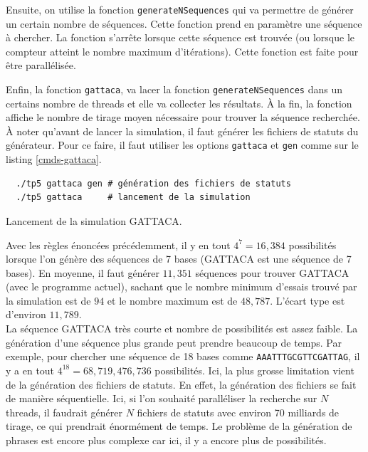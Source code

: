 \documentclass[a4paper]{article}
\begin{document}
Ensuite, on utilise la fonction \texttt{generateNSequences} qui va permettre
de générer un certain nombre de séquences. Cette fonction prend en paramètre une
séquence à chercher. La fonction s'arrête lorsque cette séquence est trouvée (ou
lorsque le compteur atteint le nombre maximum d'itérations). Cette fonction est
faite pour être parallélisée.

Enfin, la fonction \texttt{gattaca}, va lacer la fonction
\texttt{generateNSequences} dans un certains nombre de threads et elle va
collecter les résultats. À la fin, la fonction affiche le nombre de tirage moyen
nécessaire pour trouver la séquence recherchée.\\

À noter qu'avant de lancer la simulation, il faut générer les fichiers de
statuts du générateur. Pour ce faire, il faut utiliser les options
\texttt{gattaca} et \texttt{gen} comme sur le listing \ref{cmds-gattaca}.

\begin{listing}[ht!]
\begin{verbatim}
  ./tp5 gattaca gen # génération des fichiers de statuts
  ./tp5 gattaca     # lancement de la simulation
\end{verbatim}
\caption{Lancement de la simulation GATTACA.}
\label{cmds-gattaca}
\end{listing}

Avec les règles énoncées précédemment, il y en tout $4^7 = 16,384$ possibilités
lorsque l'on génère des séquences de 7 bases (GATTACA est une séquence de 7
bases). En moyenne, il faut générer $11,351$ séquences pour trouver GATTACA (avec
le programme actuel), sachant que le nombre minimum d'essais trouvé par la
simulation est de $94$ et le nombre maximum est de $48,787$. L'écart type est
d'environ $11,789$.\\

La séquence GATTACA très courte et nombre de possibilités est assez faible. La
génération d'une séquence plus grande peut prendre beaucoup de temps. Par
exemple, pour chercher une séquence de 18 bases comme
\texttt{AAATTTGCGTTCGATTAG}, il y a en tout $4^{18} = 68,719,476,736$
possibilités. Ici, la plus grosse limitation vient de la génération des fichiers
de statuts. En effet, la génération des fichiers se fait de manière
séquentielle. Ici, si l'on souhaité paralléliser la recherche sur $N$ threads,
il faudrait générer $N$ fichiers de statuts avec environ 70 milliards de tirage,
ce qui prendrait énormément de temps. Le problème de la génération de phrases
est encore plus complexe car ici, il y a encore plus de possibilités.
\end{document}
